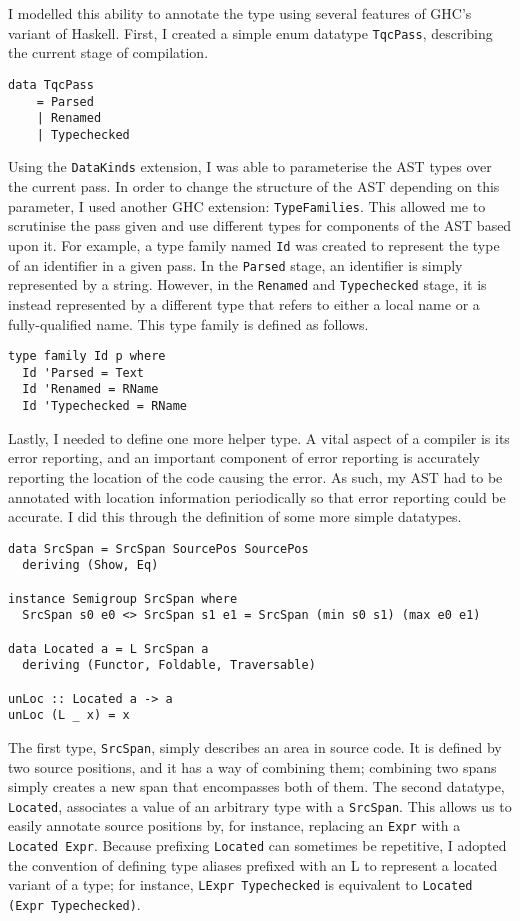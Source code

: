 \documentclass[9pt]{extarticle}
\begin{document}
I modelled this ability to annotate the type using several features of
GHC's variant of Haskell. First, I created a simple enum datatype
\verb'TqcPass', describing the current stage of compilation.

\begin{verbatim}
data TqcPass
	= Parsed
	| Renamed
	| Typechecked
\end{verbatim}

Using the \verb'DataKinds' extension, I was able to parameterise the AST
types over the current pass. In order to change the structure of the AST
depending on this parameter, I used another GHC extension:
\verb'TypeFamilies'. This allowed me to scrutinise the pass given and
use different types for components of the AST based upon it. For
example, a type family named \verb'Id' was created to represent the type
of an identifier in a given pass. In the \verb'Parsed' stage, an
identifier is simply represented by a string. However, in the
\verb'Renamed' and \verb'Typechecked' stage, it is instead represented
by a different type that refers to either a local name or a
fully-qualified name. This type family is defined as follows.

\begin{verbatim}
type family Id p where
  Id 'Parsed = Text
  Id 'Renamed = RName
  Id 'Typechecked = RName
\end{verbatim}

Lastly, I needed to define one more helper type. A vital aspect of a
compiler is its error reporting, and an important component of error
reporting is accurately reporting the location of the code causing the
error. As such, my AST had to be annotated with location information
periodically so that error reporting could be accurate. I did this
through the definition of some more simple datatypes.

\begin{verbatim}
data SrcSpan = SrcSpan SourcePos SourcePos
  deriving (Show, Eq)

instance Semigroup SrcSpan where
  SrcSpan s0 e0 <> SrcSpan s1 e1 = SrcSpan (min s0 s1) (max e0 e1)

data Located a = L SrcSpan a
  deriving (Functor, Foldable, Traversable)

unLoc :: Located a -> a
unLoc (L _ x) = x
\end{verbatim}

The first type, \verb'SrcSpan', simply describes an area in source code.
It is defined by two source positions, and it has a way of combining
them; combining two spans simply creates a new span that encompasses
both of them. The second datatype, \verb'Located', associates a value of
an arbitrary type with a \verb'SrcSpan'. This allows us to easily
annotate source positions by, for instance, replacing an \verb'Expr'
with a \verb'Located Expr'. Because prefixing \verb'Located' can
sometimes be repetitive, I adopted the convention of defining type
aliases prefixed with an L to represent a located variant of a type; for
instance, \verb'LExpr Typechecked' is equivalent to
\verb'Located (Expr Typechecked)'.
\end{document}

